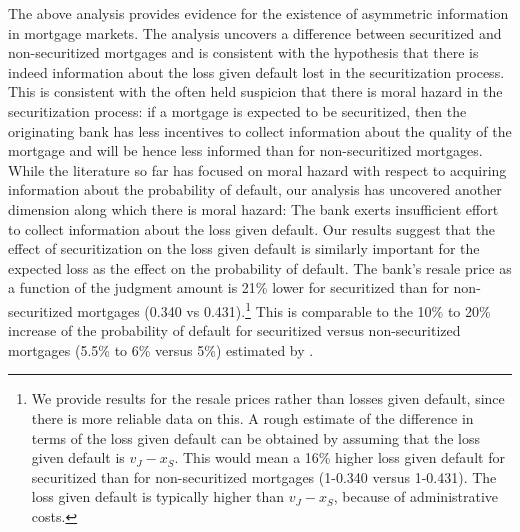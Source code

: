 \documentclass[11pt,twopage]{article}
\begin{document}
The above analysis provides evidence for the existence of asymmetric information in mortgage markets. The analysis uncovers a difference between securitized and non-securitized mortgages and is consistent with the hypothesis that there is indeed information about the loss given default lost in the securitization process. This is consistent with the often held suspicion that there is moral hazard in the securitization process: if a mortgage is expected to be securitized, then the originating bank has less incentives to collect information about the quality of the mortgage and will be hence less informed than for non-securitized mortgages. While the literature so far has focused on moral hazard with respect to acquiring information about the probability of default, our analysis has uncovered another dimension along which there is moral hazard: The bank exerts insufficient effort to collect information about the loss given default. Our results suggest that the effect of securitization on the loss given default is similarly important for the expected loss as the effect on the probability of default. The bank's resale price as a function of the judgment amount is 21\% lower for securitized than for non-securitized mortgages (0.340 vs 0.431).\footnote{We provide results for the resale prices rather than losses given default, since there is more reliable data on this. A rough estimate of the difference in terms of the loss given default can be obtained by assuming that the loss given default is $v_J-x_S$. This would mean a 16\% higher loss given default for securitized than for non-securitized mortgages (1-0.340 versus 1-0.431). The loss given default is typically higher than $v_J-x_S$, because of administrative costs.} This is comparable to the 10\% to 20\% increase of the probability of default for securitized versus non-securitized mortgages (5.5\% to 6\% versus 5\%) estimated by \cite{keys2008did}.
\end{document}
